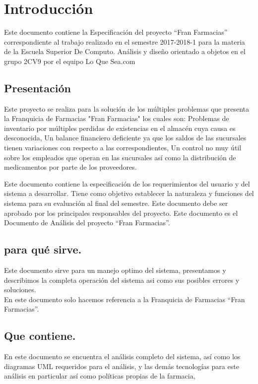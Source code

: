 \chapter{Introducción}
Este documento contiene la Especificación del proyecto “Fran Farmacias” correspondiente al trabajo realizado en el
semestre 2017-2018-1 para la materia de la Escuela Superior De Computo. Análisis y diseño orientado a objetos en el
grupo 2CV9 por el equipo Lo Que Sea.com

\section{Presentación}
Este proyecto se realiza para la solución de los múltiples problemas que presenta la Franquicia de Farmacias "Fran Farmacias" los cuales son: Problemas de inventario por múltiples perdidas de existencias en el almacén cuya causa es desconocida, Un balance financiero deficiente ya que los saldos de las sucursales tienen variaciones con respecto a las correspondientes, Un control no muy útil sobre los  empleados que operan en las sucursales así como la distribución de medicamentos por parte de los proveedores.

Este documento contiene la especificación de los requerimientos del usuario y del sistema a desarrollar.
Tiene como objetivo establecer la naturaleza y funciones del sistema para su evaluación al final del semestre. 
Este documento debe ser aprobado por los principales responsables del proyecto.
Este documento es el Documento de Análisis del proyecto “Fran Farmacias”.

\section{para qué sirve.}
Este documento sirve para un manejo optimo del sistema, presentamos y describimos la completa operación del sistema asi como sus posibles errores y soluciones.\\
En este documento solo hacemos referencia a la Franquicia de Farmacias “Fran Farmacias”.
\section{Que contiene.}
En este documento se encuentra el análisis completo del sistema, así como los diagramas UML requeridos para el análisis, y las demás tecnologías para este análisis en particular así como políticas propias de la farmacia,
